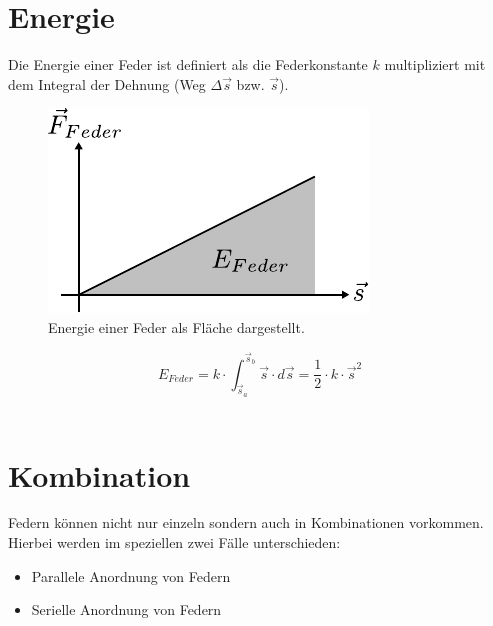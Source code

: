\section{Energie}\label{sec:feder-energie}
Die Energie einer Feder ist definiert als die Federkonstante $k$ multipliziert
mit dem Integral der Dehnung (Weg $\Delta \vec{s}$ bzw. $\vec{s}$).
\begin{figure}[h!]
	\centering
	\includegraphics[scale=0.9]{../fig/feder-energie.pdf}
	\caption{Energie einer Feder als Fläche dargestellt.}
	\label{fig:feder-energie}
\end{figure}

\[ \boxed{E_{Feder} 
	= k \cdot \int_{\vec{s}_a}^{\vec{s}_b} \vec{s} \cdot d\vec{s} 
	= \frac{1}{2} \cdot k \cdot \vec{s}^2
} \] \\

\section{Kombination}
Federn können nicht nur einzeln sondern auch in Kombinationen vorkommen. 
Hierbei werden im speziellen zwei Fälle unterschieden:

\begin{itemize}
	\item Parallele Anordnung von Federn
	\item Serielle Anordnung von Federn
\end{itemize}


